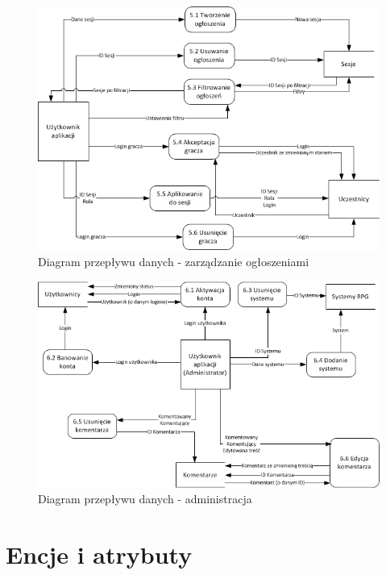 \begin{figure}[h!]
\begin{center}
\includegraphics[scale=1]{./img/DFD-announcements.png}
\caption[Diagram przepływu danych]{Diagram przepływu danych - zarządzanie ogłoszeniami}
\label{fig:DFD-announcements}
\end{center}
\end{figure}

\begin{figure}[h!]
\begin{center}
\includegraphics[scale=1]{./img/DFD-admin.png}
\caption[Diagram przepływu danych]{Diagram przepływu danych - administracja}
\label{fig:DFD-admin}
\end{center}
\end{figure}



\clearpage
\section{Encje i atrybuty}
\label{sec:encje}

